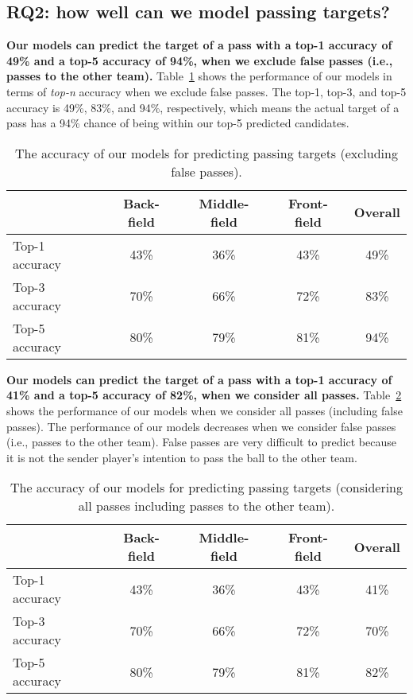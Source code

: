 \subsection{RQ2: how well can we model passing targets?}\label{RQ2-results}

\textbf{Our models can predict the target of a pass with a top-1 accuracy of 49\% and a top-5 accuracy of 94\%, when we exclude false passes (i.e., passes to the other team).}
Table~\ref{tab:performance-accurate-passes} shows the performance of our models in terms of \textit{top-n} accuracy when we exclude false passes. 
The top-1, top-3, and top-5 accuracy is 49\%, 83\%, and 94\%, respectively, which means the actual target of a pass has a 94\% chance of being within our top-5 predicted candidates.

\begin{table}[!t]
\caption{The accuracy of our models for predicting passing targets (excluding false passes).}
\centering
\begin{tabular}{lcccc}
  \hline
  & Back-field & Middle-field & Front-field & Overall \\
  \hline
  Top-1 accuracy & 43\% & 36\% & 43\% & 49\% \\
  Top-3 accuracy & 70\% & 66\% & 72\% & 83\% \\
  Top-5 accuracy & 80\% & 79\% & 81\% & 94\% \\
  \hline
\end{tabular}
\label{tab:performance-accurate-passes}
\end{table}

\textbf{Our models can predict the target of a pass with a top-1 accuracy of 41\% and a top-5 accuracy of 82\%, when we consider all passes.}
Table~\ref{tab:performance-all-passes} shows the performance of our models when we consider all passes (including false passes). 
The performance of our models decreases when we consider false passes (i.e., passes to the other team). 
False passes are very difficult to predict because it is not the sender player's intention to pass the ball to the other team. 

\begin{table}[!t]
\caption{The accuracy of our models for predicting passing targets (considering all passes including passes to the other team).}
\centering
\begin{tabular}{lcccc}
  \hline
  & Back-field & Middle-field & Front-field & Overall \\
  \hline
  Top-1 accuracy & 43\% & 36\% & 43\% & 41\% \\
  Top-3 accuracy & 70\% & 66\% & 72\% & 70\% \\
  Top-5 accuracy & 80\% & 79\% & 81\% & 82\% \\
  \hline
\end{tabular}
\label{tab:performance-all-passes}
\end{table}

